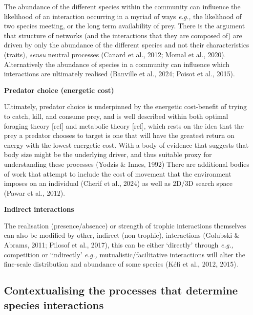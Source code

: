 \documentclass[
]{article}
\begin{document}
The abundance of the different species within the community can
influence the likelihood of an interaction occurring in a myriad of ways
\emph{e.g.,} the likelihood of two species meeting, or the long term
availability of prey. There is the argument that structure of networks
(and the interactions that they are composed of) are driven by only the
abundance of the different species and not their characteristics
(traits), \emph{sensu} neutral processes (Canard et al., 2012; Momal et
al., 2020). Alternatively the abundance of species in a community can
influence which interactions are ultimately realised (Banville et al.,
2024; Poisot et al., 2015).

\textbf{Predator choice (energetic cost)}

Ultimately, predator choice is underpinned by the energetic cost-benefit
of trying to catch, kill, and consume prey, and is well described within
both optimal foraging theory {[}ref{]} and metabolic theory {[}ref{]},
which rests on the idea that the prey a predator chooses to target is
one that will have the greatest return on energy with the lowest
energetic cost. With a body of evidence that suggests that body size
might be the underlying driver, and thus suitable proxy for
understanding these processes (Yodzis \& Innes, 1992) There are
additional bodies of work that attempt to include the cost of movement
that the environment imposes on an individual (Cherif et al., 2024) as
well as 2D/3D search space (Pawar et al., 2012).

\textbf{Indirect interactions}

The realisation (presence/absence) or strength of trophic interactions
themselves can also be modified by other, indirect (non-trophic),
interactions (Golubski \& Abrams, 2011; Pilosof et al., 2017), this can
be either `directly' through \emph{e.g.,} competition or `indirectly'
\emph{e.g.,} mutualistic/facilitative interactions will alter the
fine-scale distribution and abundance of some species (Kéfi et al.,
2012, 2015).

\subsection{Contextualising the processes that determine species
interactions}\label{contextualising-the-processes-that-determine-species-interactions}
\end{document}

